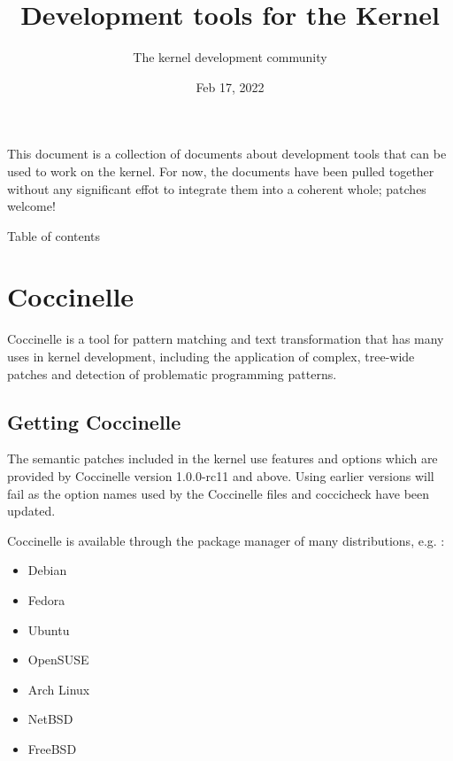 \documentclass[a4paper,8pt,english]{sphinxmanual}
\title{Development tools for the Kernel}
\date{Feb 17, 2022}
\author{The kernel development community}
\begin{document}
\maketitle
\tableofcontents
{}\label{dev-tools/index::doc}


This document is a collection of documents about development tools that can
be used to work on the kernel.  For now, the documents have been pulled
together without any significant effot to integrate them into a coherent
whole; patches welcome!

Table of contents


\chapter{Coccinelle}
\label{dev-tools/coccinelle:development-tools-for-the-kernel}\label{dev-tools/coccinelle::doc}\label{dev-tools/coccinelle:coccinelle}
Coccinelle is a tool for pattern matching and text transformation that has
many uses in kernel development, including the application of complex,
tree-wide patches and detection of problematic programming patterns.


\section{Getting Coccinelle}
\label{dev-tools/coccinelle:getting-coccinelle}
The semantic patches included in the kernel use features and options
which are provided by Coccinelle version 1.0.0-rc11 and above.
Using earlier versions will fail as the option names used by
the Coccinelle files and coccicheck have been updated.

Coccinelle is available through the package manager
of many distributions, e.g. :
\begin{itemize}
\item {} 
Debian

\item {} 
Fedora

\item {} 
Ubuntu

\item {} 
OpenSUSE

\item {} 
Arch Linux

\item {} 
NetBSD

\item {} 
FreeBSD

\end{itemize}
\end{document}
